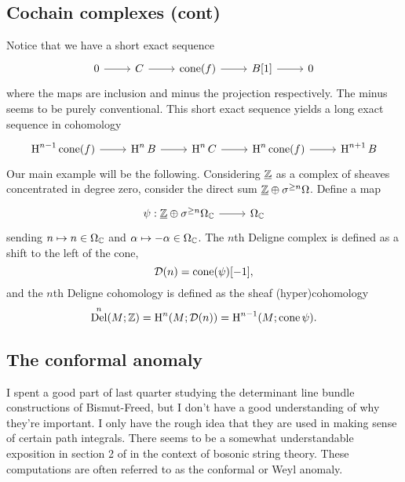 \documentclass{amsart}
\DeclareMathOperator{\Del}{Del} %
\begin{document}
\subsection{Cochain complexes (cont)}
Notice that we have a short exact sequence
\begin{equation*}
    \begin{tikzcd}
        0\rar& C\rar& \cone(f)\rar& B[1]\rar& 0
    \end{tikzcd}
\end{equation*}
where the maps are inclusion and minus the projection respectively. The minus seems to
be purely conventional. This short exact sequence yields a long exact sequence in
cohomology
\begin{equation*}
    \begin{tikzcd}
        \HH^{n-1}\cone(f) \rar& \HH^nB\rar& \HH^nC\rar& \HH^n\cone(f)\rar& \HH^{n+1}B
    \end{tikzcd}
\end{equation*}
Our main example will be the following. Considering $\underline{\mathbb{Z}}$ as a complex
of sheaves concentrated in degree zero, consider the direct sum
$\underline{\mathbb{Z}}\oplus\sigma^{\geq n}\Omega$.
Define a map
\begin{equation*}
    \begin{tikzcd}
        \psi:\underline{\Z}\oplus\sigma^{\geq n}\Omega_\C \rar& \Omega_\C
    \end{tikzcd}
\end{equation*}
sending $n\mapsto n\in\Omega_{\mathbb{C}}$ and $\alpha\mapsto -\alpha\in\Omega_{\mathbb{C}}$.
The $n$th Deligne complex is defined as a shift to the left of the cone,
\begin{equation*}
    \mathcal{D}(n) = \operatorname{cone}(\psi)[-1],
\end{equation*}
and the $n$th Deligne cohomology is defined as the sheaf (hyper)cohomology
\begin{equation*}
    \Del^n(M;\Z) = \HH^n(M;\mathcal{D}(n)) = \HH^{n-1}(M;\cone\psi).
\end{equation*}

\subsection{The conformal anomaly}
I spent a good part of last quarter studying the determinant line bundle constructions
of Bismut-Freed, but I don't have a good understanding of why they're important.
I only have the rough idea that they are used in making sense of certain path integrals.
There seems to be a somewhat understandable exposition in section 2 of \cite{dts} in
the context of bosonic string theory. These computations are often referred to as the
conformal or Weyl anomaly.
\end{document}
